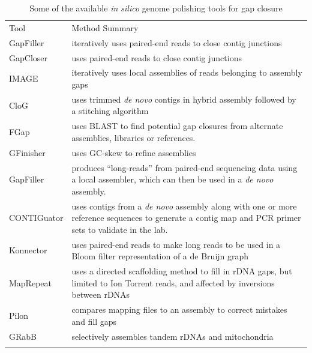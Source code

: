 \documentclass[a4,center,fleqn]{NAR}
\begin{document}
\begin{table}[t]
\centering
\caption{Some of the available \textit{in silico} genome polishing tools for gap closure}
\label{table:tools}
\begin{tabular*}{\textwidth}{p{2.7cm}p{13cm}}
  \toprule
  Tool &  Method Summary \\
  \colrule
  GapFiller \cite{Boetzer2012} & iteratively uses paired-end reads to close contig junctions \\

  GapCloser \cite{Luo2012} & uses paired-end reads to close contig junctions \\

  IMAGE \cite{Tsai2010} & iteratively uses local assemblies of reads belonging to  assembly gaps \\

  CloG \cite{Yang2011} & uses trimmed \textit{de novo} contigs in hybrid assembly followed by a stitching algorithm \\

  FGap \cite{Piro2014,Guizelini2016} & uses BLAST to find potential gap closures from alternate assemblies, libraries or references. \\

  GFinisher \cite{Guizelini2016} & uses GC-skew to refine assemblies \\

  GapFiller \cite{Nadalin2012} &  produces ``long-reads'' from paired-end sequencing data using a local assembler, which can then be used in a \textit{de novo} assembly. \\

  CONTIGuator \cite{Galardini2011} & uses contigs from a \textit{de novo} assembly along with one or more reference sequences to generate a contig map and PCR primer sets to validate in the lab. \\

  Konnector \cite{Vandervalk2015} & uses paired-end reads to make long reads to be used in a Bloom filter representation of a de Bruijn graph \\

  MapRepeat\cite{Mariano2015} & uses a directed scaffolding method to fill in rDNA gaps, but limited to Ion Torrent reads, and affected by inversions between rDNAs \cite{Mariano2016} \\

  Pilon \cite{Walker2014a} & compares mapping files to an assembly to correct mistakes and fill gaps \\
  GRabB \cite{Brankovics2016} & selectively assembles tandem rDNAs and mitochondria\\
  \botrule
\end{tabular*}
\end{table}
\end{document}
